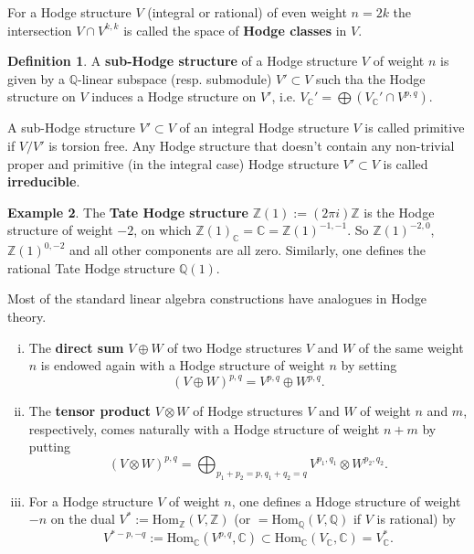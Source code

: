 \documentclass{article}
\theoremstyle{definition}
\newtheorem{definition}{Definition}[subsection]
\newtheorem{example}[definition]{Example}
\theoremstyle{plain}
\begin{document}
For a Hodge structure $ V $ (integral or rational) of even weight $ n=2k $ the intersection $ V\cap V^{k,k} $ is called the space of \textbf{Hodge classes} in $ V $.

\begin{definition}
    A \textbf{sub-Hodge structure} of a Hodge structure $ V $ of weight $ n $ is given by a $ \mathbb{Q} $-linear subspace (resp. submodule) $ V'\subset V $ such tha the Hodge structure on $ V $ induces a Hodge structure on $ V' $, i.e. $ V_{\mathbb{C}}'=\bigoplus(V_{\mathbb{C}}'\cap V^{p,q}) $.

    A sub-Hodge structure $ V'\subset V $ of an integral Hodge structure $ V $ is called primitive if $ V/V' $ is torsion free. Any Hodge structure that doesn't contain any non-trivial proper and primitive (in the integral case) Hodge structure $ V'\subset V $ is called \textbf{irreducible}.
\end{definition}

\begin{example}
    The \textbf{Tate Hodge structure} $ \mathbb{Z}(1):= (2\pi i)\mathbb{Z} $ is the Hodge structure of weight $ -2 $, on which $ \mathbb{Z}(1)_{\mathbb{C}}=\mathbb{C}=\mathbb{Z}(1)^{-1,-1} $. So $ \mathbb{Z}(1)^{-2,0} $, $ \mathbb{Z}(1)^{0,-2} $ and all other components are all zero. Similarly, one defines the rational Tate Hodge structure $ \mathbb{Q}(1) $.
\end{example}

Most of the standard linear algebra constructions have analogues in Hodge theory.

\begin{enumerate}[(i)]
    \item The \textbf{direct sum} $ V\oplus W $ of two Hodge structures $ V $ and $ W $ of the same weight $ n $ is endowed again with a Hodge structure of weight $ n $ by setting\[
        (V\oplus W)^{p,q}=V^{p,q}\oplus W^{p,q}.
    \]
    \item The \textbf{tensor product} $ V\otimes W $ of Hodge structures $ V $ and $ W $ of weight $ n $ and $ m $, respectively, comes naturally with a Hodge structure of weight $ n+m $ by putting\[
        (V\otimes W)^{p,q}=\bigoplus_{p_1+p_2=p,q_1+q_2=q}V^{p_1,q_1}\otimes W^{p_2,q_2}.
    \]
    \item For a Hodge structure $ V $ of weight $ n $, one defines a Hdoge structure of weight $ -n $ on the dual $ V^*:=\mathrm{Hom}_{\mathbb{Z}}(V,\mathbb{Z}) $ (or $ =\mathrm{Hom}_{\mathbb{Q}}(V,\mathbb{Q}) $ if $ V $ is rational) by\[
        V^{*-p,-q}:=\mathrm{Hom}_{\mathbb{C}}(V^{p,q},\mathbb{C})\subset \mathrm{Hom}_{\mathbb{C}}(V_{\mathbb{C}},\mathbb{C})=V^*_{\mathbb{C}}.
    \]
\end{enumerate}
\end{document}
